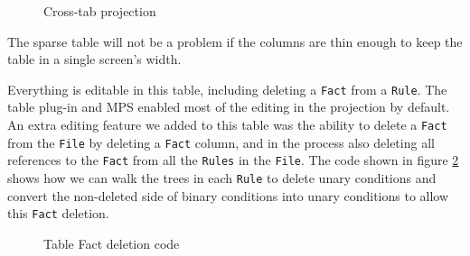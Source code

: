 \begin{figure}
    \centering
    \caption{Cross-tab projection}
    \label{fig:crosstabProjection1}
\end{figure}

The sparse table will not be a problem if the columns are thin enough to keep the table in a single screen's width.

Everything is editable in this table, including deleting a \texttt{Fact} from a \texttt{Rule}.
The table plug-in and MPS enabled most of the editing in the projection by default.
An extra editing feature we added to this table was the ability to delete a \texttt{Fact} from the \texttt{File} by deleting a \texttt{Fact} column, and in the process also deleting all references to the \texttt{Fact} from all the \texttt{Rules} in the \texttt{File}.
The code shown in figure \ref{fig:tableFactDeletion} shows how we can walk the trees in each \texttt{Rule} to delete unary conditions and convert the non-deleted side of binary conditions into unary conditions to allow this \texttt{Fact} deletion.

\begin{figure}
    \centering
    \caption{Table Fact deletion code}
    \label{fig:tableFactDeletion}
\end{figure}


